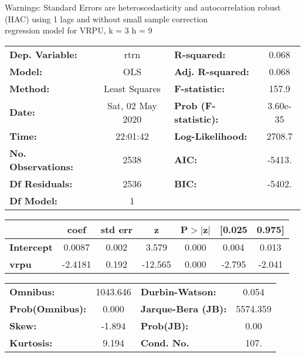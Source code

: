 Warnings: \newline
 [1] Standard Errors are heteroscedasticity and autocorrelation robust (HAC) using 1 lags and without small sample correction\\ 

regression model for VRPU, k = 3 h = 9\begin{center}
\begin{tabular}{lclc}
\toprule
\textbf{Dep. Variable:}    &       rtrn       & \textbf{  R-squared:         } &     0.068   \\
\textbf{Model:}            &       OLS        & \textbf{  Adj. R-squared:    } &     0.068   \\
\textbf{Method:}           &  Least Squares   & \textbf{  F-statistic:       } &     157.9   \\
\textbf{Date:}             & Sat, 02 May 2020 & \textbf{  Prob (F-statistic):} &  3.60e-35   \\
\textbf{Time:}             &     22:01:42     & \textbf{  Log-Likelihood:    } &    2708.7   \\
\textbf{No. Observations:} &        2538      & \textbf{  AIC:               } &    -5413.   \\
\textbf{Df Residuals:}     &        2536      & \textbf{  BIC:               } &    -5402.   \\
\textbf{Df Model:}         &           1      & \textbf{                     } &             \\
\bottomrule
\end{tabular}
\begin{tabular}{lcccccc}
                   & \textbf{coef} & \textbf{std err} & \textbf{z} & \textbf{P$> |$z$|$} & \textbf{[0.025} & \textbf{0.975]}  \\
\midrule
\textbf{Intercept} &       0.0087  &        0.002     &     3.579  &         0.000        &        0.004    &        0.013     \\
\textbf{vrpu}      &      -2.4181  &        0.192     &   -12.565  &         0.000        &       -2.795    &       -2.041     \\
\bottomrule
\end{tabular}
\begin{tabular}{lclc}
\textbf{Omnibus:}       & 1043.646 & \textbf{  Durbin-Watson:     } &    0.054  \\
\textbf{Prob(Omnibus):} &   0.000  & \textbf{  Jarque-Bera (JB):  } & 5574.359  \\
\textbf{Skew:}          &  -1.894  & \textbf{  Prob(JB):          } &     0.00  \\
\textbf{Kurtosis:}      &   9.194  & \textbf{  Cond. No.          } &     107.  \\
\bottomrule
\end{tabular}
\end{center}

